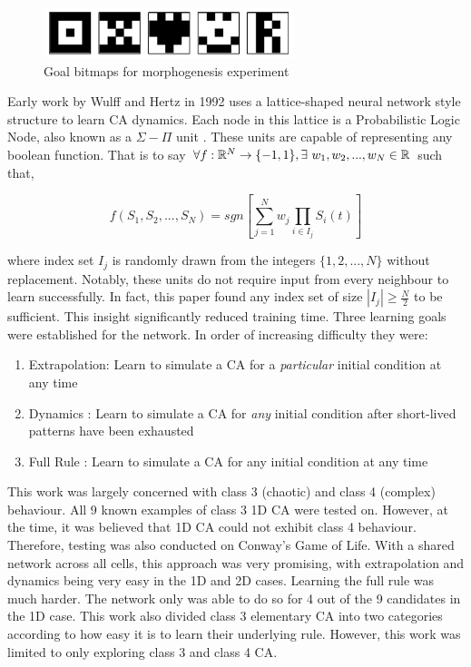 \begin{figure}[!h]
\centering
\includegraphics[width=.5\textwidth]{images/bitmap-goals.png}
\caption{Goal bitmaps for morphogenesis experiment\cite{breukelaar2004evolving}}
\label{fig:goal-bitmaps}
\end{figure}

Early work by Wulff and Hertz in 1992\cite{wulff1992learning} uses a lattice-shaped neural network style structure to learn CA dynamics. Each node in this lattice is a Probabilistic Logic Node, also known as a $\Sigma-\Pi$ unit \cite{gurney1992training}. These units are capable of representing any boolean function. That is to say $ \forall f: \mathbb{R}^N \to \{-1, 1\}, \exists~w_1, w_2, ... , w_N \in \mathbb{R} $ such that,

\begin{equation} \label{eq:sigma_pi}
f(S_1, S_2, ..., S_N) = sgn\left[ \sum_{j=1}^{N} w_j \prod_{i \in I_j} S_i(t) \right]
\end{equation}

where index set $I_j$ is randomly drawn from the integers $\{1, 2, ..., N\}$ without replacement. Notably, these units do not require input from every neighbour to learn successfully. In fact, this paper found any index set of size $|I_j| \geq \frac{N}{2}$ to be sufficient. This insight significantly reduced training time. Three learning goals were established for the network. In order of increasing difficulty they were:

\begin{enumerate}
  \item Extrapolation: Learn to simulate a CA for a \textit{particular} initial condition at any time
  \item Dynamics : Learn to simulate a CA for \textit{any} initial condition after short-lived patterns have been exhausted
  \item Full Rule : Learn to simulate a CA for any initial condition at any time
\end{enumerate}

This work was largely concerned with class 3 (chaotic) and class 4 (complex) behaviour.  All 9 known examples of class 3 1D CA were tested on. However, at the time, it was believed that 1D CA could not exhibit class 4 behaviour. Therefore, testing was also conducted on Conway's Game of Life. With a shared network across all cells, this approach was very promising, with extrapolation and dynamics being very easy in the 1D and 2D cases. Learning the full rule was much harder. The network only was able to do so for 4 out of the 9 candidates in the 1D case. This work also divided class 3 elementary CA into two categories according to how easy it is to learn their underlying rule. However, this work was limited to only exploring class 3 and class 4 CA.\\

